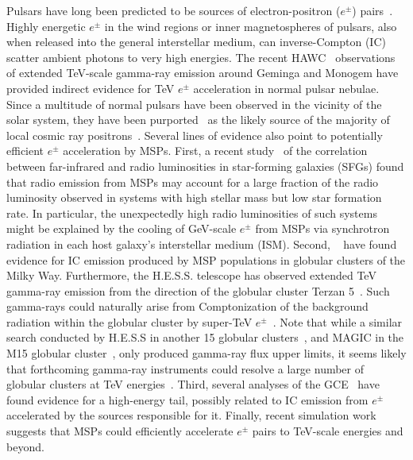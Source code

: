 \documentclass[doublespace,nopageskip]{VTthesis} %
\begin{document}
Pulsars have long been predicted to be sources of electron-positron ($e^{\pm}$) pairs~\citep{1966RvMP...38..626E,1970Natur.227..465S,1971ApJ...164..529S, 1995A&A...294L..41A, 1995PhRvD..52.3265A}. Highly energetic $e^{\pm}$ in the wind regions or inner magnetospheres of pulsars, 
also when released into the general interstellar medium,
can inverse-Compton (IC) scatter ambient photons to very high energies. 
The recent HAWC~\citep{2017Sci...358..911A} observations of extended TeV-scale gamma-ray emission around Geminga and Monogem have provided indirect evidence for TeV $e^{\pm}$ acceleration in normal pulsar nebulae.  Since a multitude of normal pulsars have been observed in the vicinity of the solar system, they have been purported~\citep{2009JCAP...01..025H, 2010A&A...524A..51D,2017Sci...358..911A,2017PhRvD..96j3013H, 2018PhRvD..97l3008P,2019PhRvD.100l3015D, 2019ApJ...879...91J} as the likely source of the majority of local cosmic ray positrons~\citep{2013PhRvL.110n1102A}.    
Several lines of evidence also point to potentially efficient $e^{\pm}$ acceleration by MSPs. First, a recent study~\citep{2021PhRvD.103h3017S} of the correlation between far-infrared and radio luminosities in star-forming galaxies (SFGs) found that radio emission from MSPs may account for a large fraction of the radio luminosity observed in systems with high stellar mass but low star formation rate. 
%
In particular, the unexpectedly high radio luminosities of such
systems
might be explained by the cooling of GeV-scale $e^{\pm}$ from MSPs via synchrotron radiation in each host galaxy's interstellar medium (ISM). Second, ~\citet{2021MNRAS.507.5161S} have found evidence for IC emission produced by MSP populations in globular clusters of the Milky Way. Furthermore, the H.E.S.S. telescope has observed extended TeV gamma-ray emission from the direction of the globular cluster Terzan 5~\citep{2013A&A...551A..26H}. Such gamma-rays could naturally arise from Comptonization of the background radiation within the globular cluster by super-TeV $e^{\pm}$~\citep{2016MNRAS.458.1083B}. 
%
Note that while a similar search conducted by H.E.S.S in another 15 globular clusters~\citep{2013A&A...551A..26H}, and MAGIC in the M15 globular cluster~\citep{2019MNRAS.484.2876M}, only produced gamma-ray flux upper limits, it seems likely that forthcoming gamma-ray instruments could resolve a large number of globular clusters at TeV energies~\citep{2018MNRAS.473..897N,2021MNRAS.500.4827N}. 
Third, several analyses of the GCE~\citep[e.g.,][]{2016JCAP...11..053H,2016PhRvD..94j3013L,2021PhRvD.103f3029D} have found evidence for a high-energy tail, possibly related to IC emission from $e^\pm$ accelerated by the sources responsible for it. 
%
Finally, recent simulation work \citep{2020A&A...635A.138G} suggests that MSPs could efficiently accelerate $e^{\pm}$ pairs to TeV-scale energies and beyond. 
\end{document}
